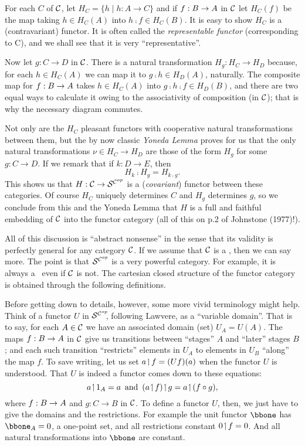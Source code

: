 For each $C$ of $\mathcal C$, let $H_C = \{ h \mid h: A \to C \}$ and if $f: B \rightarrow A$ in $\mathcal C$ let
$H_C(f)$ be the map taking $h \in H_C(A)$ into $h \comp f \in H_C(B)$. It is easy to show
$H_C$ is a (contravariant) functor. It is often called the {\it representable functor}
(corresponding to C), and we shall see that it is very ``representative''.

Now let $g: C \to D$ in $\mathcal C$. There is a natural transformation $H_g: H_C \to H_D$
because, for each $h \in H_C(A)$ we can map it to $g \comp h \in H_D(A)$, naturally.
The composite map for $f : B \rightarrow A$ takes $h \in H_C(A)$ into $g \comp h \comp f \in H_D(B)$,
and there are two equal ways to calculate it owing to the associativity of composition (in
$\mathcal C$); that is why the necessary diagram commutes.

Not only are the $H_C$ pleasant functors with cooperative natural transformations between
them, but the by now classic {\it Yoneda Lemma} proves for us that the only natural
transformations $\nu \in H_C \to H_D$ are those of the form $H_g$ for some $g: C\to D$.
If we remark that if $k:D\to E$, then
\[
H_k \comp H_g = H_{k \comp g}.
\]
%
This shows us that $H : \mathcal C \rightarrow \mathcal S^{\mathcal C^{op}}$ is a ({\it covariant}) functor between these
categories. Of course $H_C$ uniquely determines $C$ and $H_g$ determines $g$, so we
conclude from this and the Yoneda Lemma that $H$ is a full and faithful embedding of $\mathcal C$
into the functor category (all of this on p.2 of Johnstone (1977)!).

All of this discussion is ``abstract nonsense'' in the sense that its validity is
perfectly general for any category $\mathcal C$. If we assume that $\mathcal C$ is a \ccc, then we can say
more. The point is that $\mathcal S^{\mathcal C^{op}}$ is a very powerful category. For example, it is always a
\ccc\  even if $\mathcal C$ is not. The cartesian closed structure of the functor category is
obtained through the following definitions.

Before getting down to details, however, some more vivid terminology might help.
Think of a functor $U$ in $\mathcal S^{\mathcal C^{op}}\!\!$, following Lawvere, as a ``variable domain''.  That
is to say, for each $A \in \mathcal C$ we have an associated domain (set) $U_A = U(A)$. The maps
$f:B \rightarrow A$ in $\mathcal C$ give us transitions between ``stages'' $A$ and ``later'' stages $B$; and
each such transition ``restricts'' elements in $U_A$ to elements in $U_B$ ``along'' the
map $f$. To save writing, let us set $a \!\upharpoonleft\! f = (Uf)(a)$ when the functor $U$ is
understood. That $U$ is indeed a functor comes down to these equations:
$$
a \res \id_A = a \,\textrm{ and }\, (a \res f) \res g = a \res (f \comp g),
$$
where  $f : B \rightarrow A$ and $g: C\to B$ in $\mathcal C$. To define a functor $U$, then, we just have to
give the domains and the restrictions. For example the unit functor $\bbone$ has $\bbone_A
= {0}$, a one-point set, and all restrictions constant $0 \!\upharpoonleft\! f = 0$. And all natural
transformations into $\bbone$ are constant.

